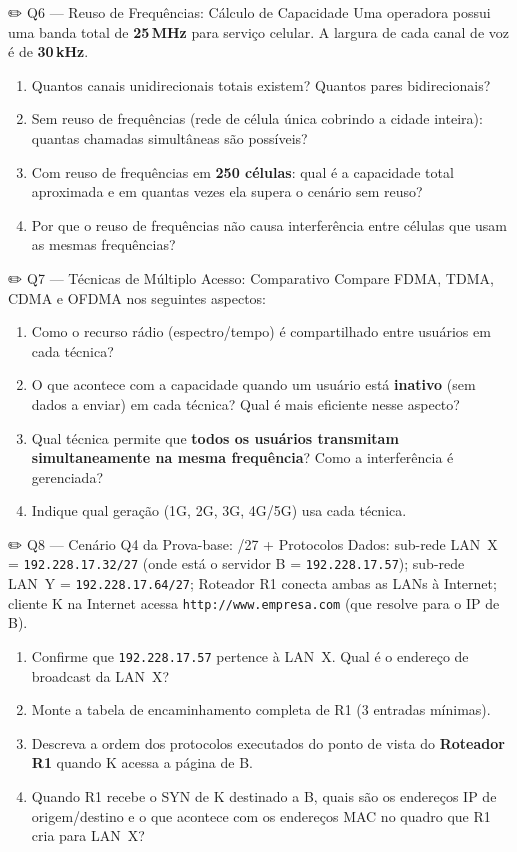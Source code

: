 \documentclass[11pt,a4paper]{article}
\begin{document}
\begin{questao}{✏️ Q6 --- Reuso de Frequências: Cálculo de Capacidade}
Uma operadora possui uma banda total de \textbf{25\,MHz} para serviço celular. A largura de cada canal de voz é de \textbf{30\,kHz}.
\begin{enumerate}[label=(\alph*)]
    \item Quantos canais unidirecionais totais existem? Quantos pares bidirecionais?
    \item Sem reuso de frequências (rede de célula única cobrindo a cidade inteira): quantas chamadas simultâneas são possíveis?
    \item Com reuso de frequências em \textbf{250 células}: qual é a capacidade total aproximada e em quantas vezes ela supera o cenário sem reuso?
    \item Por que o reuso de frequências não causa interferência entre células que usam as mesmas frequências?
\end{enumerate}
\end{questao}

\begin{questao}{✏️ Q7 --- Técnicas de Múltiplo Acesso: Comparativo}
Compare FDMA, TDMA, CDMA e OFDMA nos seguintes aspectos:
\begin{enumerate}[label=(\alph*)]
    \item Como o recurso rádio (espectro/tempo) é compartilhado entre usuários em cada técnica?
    \item O que acontece com a capacidade quando um usuário está \textbf{inativo} (sem dados a enviar) em cada técnica? Qual é mais eficiente nesse aspecto?
    \item Qual técnica permite que \textbf{todos os usuários transmitam simultaneamente na mesma frequência}? Como a interferência é gerenciada?
    \item Indique qual geração (1G, 2G, 3G, 4G/5G) usa cada técnica.
\end{enumerate}
\end{questao}

\begin{questao}{✏️ Q8 --- Cenário Q4 da Prova-base: /27 + Protocolos}
Dados: sub-rede LAN~X = \texttt{192.228.17.32/27} (onde está o servidor B = \texttt{192.228.17.57}); sub-rede LAN~Y = \texttt{192.228.17.64/27}; Roteador R1 conecta ambas as LANs à Internet; cliente K na Internet acessa \texttt{http://www.empresa.com} (que resolve para o IP de B).
\begin{enumerate}[label=(\alph*)]
    \item Confirme que \texttt{192.228.17.57} pertence à LAN~X. Qual é o endereço de broadcast da LAN~X?
    \item Monte a tabela de encaminhamento completa de R1 (3 entradas mínimas).
    \item Descreva a ordem dos protocolos executados do ponto de vista do \textbf{Roteador R1} quando K acessa a página de B.
    \item Quando R1 recebe o SYN de K destinado a B, quais são os endereços IP de origem/destino e o que acontece com os endereços MAC no quadro que R1 cria para LAN~X?
\end{enumerate}
\end{questao}
\end{document}
